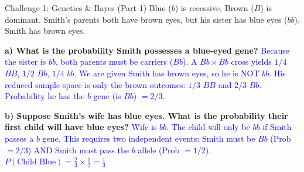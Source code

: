\documentclass[aspectratio=169]{beamer}
\begin{document}
\begin{frame}{Challenge 1: Genetics \& Bayes (Part 1)}
    \small
    Blue ($b$) is recessive, Brown ($B$) is dominant. 
    Smith's parents both have brown eyes, but his sister has blue eyes ($bb$). Smith has brown eyes.
    
    \vspace{0.2cm}
    \textbf{a) What is the probability Smith possesses a blue-eyed gene?} \pause
    \newline \textcolor{blue}{Because the sister is $bb$, both parents must be carriers ($Bb$).}
    \newline \textcolor{blue}{A $Bb \times Bb$ cross yields $1/4$ $BB$, $1/2$ $Bb$, $1/4$ $bb$.}
    \newline \textcolor{blue}{We are given Smith has brown eyes, so he is NOT $bb$. His reduced sample space is only the brown outcomes: $1/3$ $BB$ and $2/3$ $Bb$.}
    \newline \textcolor{blue}{Probability he has the $b$ gene (is $Bb$) $= 2/3$.} \pause
    
    \vspace{0.2cm}
    \textbf{b) Suppose Smith's wife has blue eyes. What is the probability their first child will have blue eyes?} \pause
    \newline \textcolor{blue}{Wife is $bb$. The child will only be $bb$ if Smith passes a $b$ gene.}
    \newline \textcolor{blue}{This requires two independent events: Smith must be $Bb$ (Prob $= 2/3$) AND Smith must pass the $b$ allele (Prob $= 1/2$).}
    \newline \textcolor{blue}{$P(\text{Child Blue}) = \frac{2}{3} \times \frac{1}{2} = \frac{1}{3}$}
\end{frame}
\end{document}
